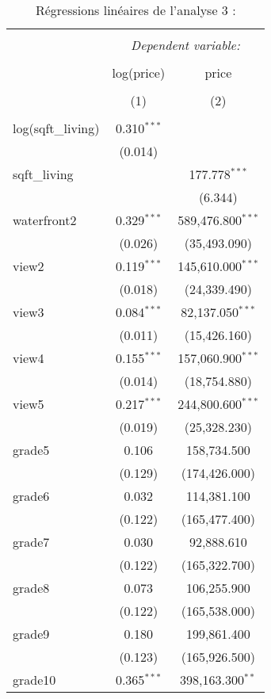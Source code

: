 \documentclass[
  11pt,
  french,
]{article}
\begin{document}
\begin{table}[!htbp] \centering 
  \caption{Régressions linéaires de l'analyse 3 :} 
  \label{} 
\small 
\begin{tabular}{@{\extracolsep{1pt}}lcc} 
\\[-1.8ex]\hline 
\hline \\[-1.8ex] 
 & \multicolumn{2}{c}{\textit{Dependent variable:}} \\ 
\cline{2-3} 
\\[-1.8ex] & log(price) & price \\ 
\\[-1.8ex] & (1) & (2)\\ 
\hline \\[-1.8ex] 
 log(sqft\_living) & 0.310$^{***}$ &  \\ 
  & (0.014) &  \\ 
  sqft\_living &  & 177.778$^{***}$ \\ 
  &  & (6.344) \\ 
  waterfront2 & 0.329$^{***}$ & 589,476.800$^{***}$ \\ 
  & (0.026) & (35,493.090) \\ 
  view2 & 0.119$^{***}$ & 145,610.000$^{***}$ \\ 
  & (0.018) & (24,339.490) \\ 
  view3 & 0.084$^{***}$ & 82,137.050$^{***}$ \\ 
  & (0.011) & (15,426.160) \\ 
  view4 & 0.155$^{***}$ & 157,060.900$^{***}$ \\ 
  & (0.014) & (18,754.880) \\ 
  view5 & 0.217$^{***}$ & 244,800.600$^{***}$ \\ 
  & (0.019) & (25,328.230) \\ 
  grade5 & 0.106 & 158,734.500 \\ 
  & (0.129) & (174,426.000) \\ 
  grade6 & 0.032 & 114,381.100 \\ 
  & (0.122) & (165,477.400) \\ 
  grade7 & 0.030 & 92,888.610 \\ 
  & (0.122) & (165,322.700) \\ 
  grade8 & 0.073 & 106,255.900 \\ 
  & (0.122) & (165,538.000) \\ 
  grade9 & 0.180 & 199,861.400 \\ 
  & (0.123) & (165,926.500) \\ 
  grade10 & 0.365$^{***}$ & 398,163.300$^{**}$ \\ 

\end{tabular}
\end{table}
\end{document}
